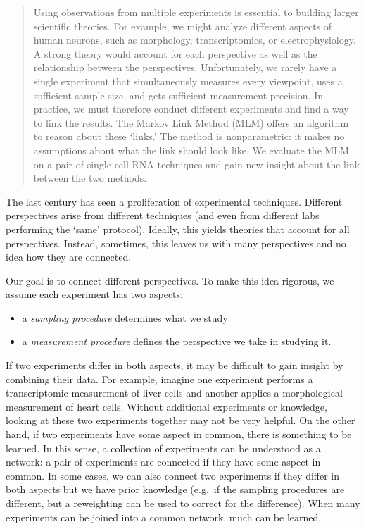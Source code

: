 \usepackage{amsthm}
\newtheorem{thm}{Theorem}
\newtheorem{lem}{Lemma}
\newtheorem{conj}{Conjecture}

\theoremstyle{definition}
\newtheorem{example}{Example}
\newtheorem{definition}{Definition}


\maketitle

\begin{abstract}
Using observations from multiple experiments is essential to building larger scientific theories.  For example, we might analyze different aspects of human neurons, such as morphology, transcriptomics, or electrophysiology.  A strong theory would account for each perspective as well as the relationship between the perspectives.  Unfortunately, we rarely have a single experiment that simultaneously measures every viewpoint, uses a sufficient sample size, and gets sufficient measurement precision.  In practice, we must therefore conduct different experiments and find a way to link the results.  The Markov Link Method (MLM) offers an algorithm to reason about these `links.' The method is nonparametric: it makes no assumptions about what the link should look like.  We evaluate the MLM on a pair of single-cell RNA techniques and gain new insight about the link between the two methods.
\end{abstract}

The last century has seen a proliferation of experimental techniques.   Different perspectives arise from different techniques (and even from different labs performing the `same' protocol).  Ideally, this yields theories that account for all perspectives.  Instead, sometimes, this leaves us with many perspectives and no idea how they are connected.  

Our goal is to connect different perspectives.  To make this idea rigorous, we assume each experiment has two aspects:
%
\begin{itemize}
    \item a \emph{sampling procedure} determines what we study
    \item a \emph{measurement procedure} defines the perspective we take in studying it.
\end{itemize}
%
If two experiments differ in both aspects, it may be difficult to gain insight by combining their data.  For example, imagine one experiment performs a transcriptomic measurement of liver cells and another applies a morphological measurement of heart cells.  Without additional experiments or knowledge, looking at these two experiments together may not be very helpful.  On the other hand, if two experiments have some aspect in common, there is something to be learned.  In this sense, a collection of experiments can be understood as a network: a pair of experiments are connected if they have some aspect in common.  In some cases, we can also connect two experiments if they differ in both aspects but we have prior knowledge (e.g.\ if the sampling procedures are different, but a reweighting can be used to correct for the difference).    When many experiments can be joined into a common network, much can be learned.  

